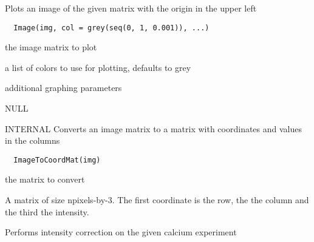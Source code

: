 \documentclass[a4paper]{book}
\begin{document}
%
\begin{Description}\relax
Plots an image of the given matrix with the origin in the
upper left
\end{Description}
%
\begin{Usage}
\begin{verbatim}
  Image(img, col = grey(seq(0, 1, 0.001)), ...)
\end{verbatim}
\end{Usage}
%
\begin{Arguments}
\begin{ldescription}
\item[\code{img}] the image matrix to plot

\item[\code{col}] a list of colors to use for plotting, defaults
to grey

\item[\code{...}] additional graphing parameters
\end{ldescription}
\end{Arguments}
%
\begin{Value}
NULL
\end{Value}
%
\begin{Description}\relax
INTERNAL Converts an image matrix to a matrix with
coordinates and values in the columns
\end{Description}
%
\begin{Usage}
\begin{verbatim}
  ImageToCoordMat(img)
\end{verbatim}
\end{Usage}
%
\begin{Arguments}
\begin{ldescription}
\item[\code{img}] the matrix to convert
\end{ldescription}
\end{Arguments}
%
\begin{Value}
A matrix of size npixels-by-3. The first coordinate is
the row, the the column and the third the intensity.
\end{Value}
%
\begin{Description}\relax
Performs intensity correction on the given calcium
experiment
\end{Description}
\end{document}

